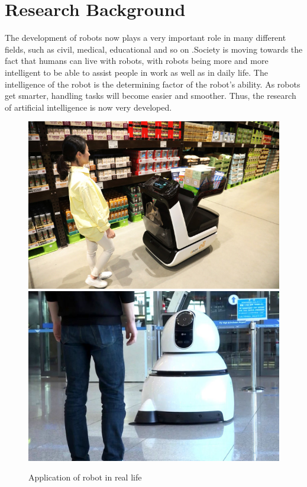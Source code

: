 \section{Research Background}


The development of robots now plays a very important role in many different fields, such as civil,
medical, educational and so on \cite{intro_1,chapter1-1,}.Society is moving towards the fact that humans can live with robots, with robots
being more and more intelligent to be able to assist people in work as well as in daily life.
The intelligence of the robot is the determining factor of the robot's ability. As robots get smarter,
handling tasks will become easier and smoother.
Thus, the research of artificial intelligence is now very developed.\\

\begin{figure}[h]
    \centering
    \begin{minipage}{\columnwidth}
        \includegraphics[width=0.48\linewidth]{figures/chap1_fig/20180417000736_0.jpg}
        \hfill
        \includegraphics[width=0.48\linewidth]{figures/chap1_fig/Airport_Cleaning_Robot_02.jpg}
        \caption{Application of robot in real life\cite{intro_2,intro_3}}
        \label{Chap1:Fig1}
    \end{minipage}\hfill
\end{figure}

